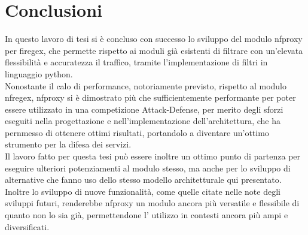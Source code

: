 \chapter*{Conclusioni}\label{chap:ending}

In questo lavoro di tesi si è concluso con successo lo sviluppo del modulo \gls{nfproxy} per firegex, che permette rispetto ai moduli già esistenti di filtrare con un'elevata flessibilità e accuratezza il traffico, tramite l'implementazione di filtri in linguaggio python.\\
Nonostante il calo di performance, notoriamente previsto, rispetto al modulo \gls{nfregex}, \gls{nfproxy} si è dimostrato più che sufficientemente performante per poter essere utilizzato in una competizione Attack-Defense, per merito degli sforzi eseguiti nella progettazione e nell'implementazione
dell'architettura, che ha pernmesso di ottenere ottimi risultati, portandolo a diventare un'ottimo strumento per la difesa dei servizi.\\

Il lavoro fatto per questa tesi può essere inoltre un ottimo punto di partenza per eseguire ulteriori potenziamenti al modulo stesso, ma anche per lo sviluppo di alternative che fanno uso dello stesso modello architetturale qui presentato.\\
Inoltre lo sviluppo di nuove funzionalità, come quelle citate nelle note degli sviluppi futuri, renderebbe \gls{nfproxy} un modulo ancora più versatile e flessibile di quanto non lo sia già, permettendone l' utilizzo in contesti ancora più ampi e diversificati.\\


